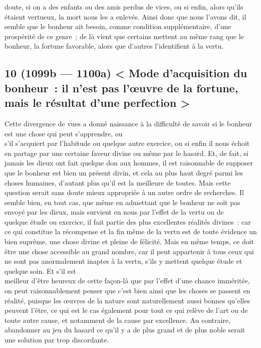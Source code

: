 \documentclass[french,twoside]{book} %
\begin{document}
doute, si on a des enfants ou des amis perdus de vices, ou si enfin, alors qu’ils étaient vertueux, la mort nous les a enlevés. Ainsi donc que nous l’avons dit, il semble que le bonheur ait besoin, comme condition supplémentaire, d’une prospérité de ce genre ; de là vient que certains mettent au même rang que le bonheur, la fortune favorable, alors que d’autres l’identifient à la vertu.
\subsection[{10 (1099b — 1100a) < Mode d’acquisition du bonheur : il n’est pas l’œuvre de la fortune, mais le résultat d’une perfection >}]{10 (1099b — 1100a) < Mode d’acquisition du bonheur : il n’est pas l’œuvre de la fortune, mais le résultat d’une perfection >}
\noindent Cette divergence de vues a donné naissance à la difficulté de savoir si le bonheur est une chose qui peut s’apprendre, ou \\
s’il s’acquiert par l’habitude ou quelque autre exercice, ou si enfin il nous échoit en partage par une certaine faveur divine ou même par le hasard. Et, de fait, si jamais les dieux ont fait quelque don aux hommes, il est raisonnable de supposer que le bonheur est bien un présent divin, et cela au plus haut degré parmi les choses humaines, d’autant plus qu’il est la meilleure de toutes. Mais cette question serait sans doute mieux appropriée à un autre ordre de recherches. Il semble bien, en tout cas, que même en admettant que le bonheur ne soit pas envoyé par les dieux, mais survient en nous par l’effet de la vertu ou de \\
quelque étude ou exercice, il fait partie des plus excellentes réalités divines : car ce qui constitue la récompense et la fin même de la vertu est de toute évidence un bien suprême, une chose divine et pleine de félicité. Mais en même temps, ce doit être une chose accessible au grand nombre, car il peut appartenir à tous ceux qui ne sont pas anormalement inaptes à la vertu, s’ils y mettent quelque étude et quelque soin. Et s’il est \\
meilleur d’être heureux de cette façon-là que par l’effet d’une chance imméritée, on peut raisonnablement penser que c’est bien ainsi que les choses se passent en réalité, puisque les œuvres de la nature sont naturellement aussi bonnes qu’elles peuvent l’être, ce qui est le cas également pour tout ce qui relève de l’art ou de toute autre cause, et notamment de la cause par excellence. Au contraire, abandonner au jeu du hasard ce qu’il y a de plus grand et de plus noble serait une solution par trop discordante.\par
\end{document}
